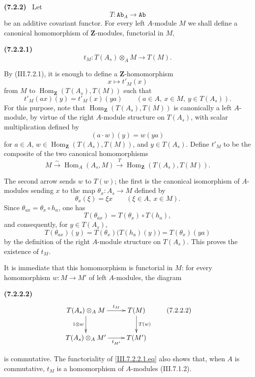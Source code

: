 \documentclass[10pt,oneside]{book}
\newcommand{\bb}[1]{\mathbf{#1}}
\newcommand{\cat}[1]{\mathtt{#1}}
\newcommand{\Hom}{\operatorname{Hom}}
\newcommand{\sref}[2][]{(#2)}
\newenvironment{env}[1][]{\par\medskip\noindent\textbf{(#1)}\ }{\par}
\begin{document}
\begin{env}[7.2.2]
\label{III.7.2.2}
Let
\[
  T:\cat{Ab}_A\longrightarrow\cat{Ab}
\]
be an additive covariant functor.  For every left $A$-module
$M$ we shall define a canonical homomorphism of $\bb Z$-modules,
functorial in $M$,
\begin{env}[7.2.2.1]
\label{III.7.2.2.1}
\[
  t_M:T(A_s)\otimes_A M\longrightarrow T(M).
  \tag{7.2.2.1}\label{III.7.2.2.1.eq}
\]
\end{env}
By \sref{III.7.2.1}, it is enough to define a
$\bb Z$-homomorphism
\[
  x\longmapsto t'_M(x)
\]
from $M$ to $\Hom_{\bb Z}(T(A_s),T(M))$ such that
\[
  t'_M(ax)(y)=t'_M(x)(ya)
  \qquad(a\in A,\ x\in M,\ y\in T(A_s)).
\]
For this purpose, note that
$\Hom_{\bb Z}(T(A_s),T(M))$ is canonically a left $A$-module,
by virtue of the right $A$-module structure on $T(A_s)$, with
scalar multiplication defined by
\[
  (a\cdot w)(y)=w(ya)
\]
for $a\in A$, $w\in\Hom_{\bb Z}(T(A_s),T(M))$, and
$y\in T(A_s)$.  Define $t'_M$ to be the composite of the two
canonical homomorphisms
\[
  M
  \xrightarrow{\sim}
  \Hom_A(A_s,M)
  \xrightarrow{T}
  \Hom_{\bb Z}(T(A_s),T(M)).
\]

The second arrow sends $w$ to $T(w)$; the first is the canonical
isomorphism of $A$-modules sending $x$ to the map
$\theta_x:A_s\to M$ defined by
\[
  \theta_x(\xi)=\xi x
  \qquad(\xi\in A,\ x\in M).
\]
Since $\theta_{ax}=\theta_x\circ h_a$, one has
\[
  T(\theta_{ax})
  =
  T(\theta_x)\circ T(h_a),
\]
and consequently, for $y\in T(A_s)$,
\[
  T(\theta_{ax})(y)
  =
  T(\theta_x)\bigl(T(h_a)(y)\bigr)
  =
  T(\theta_x)(ya)
\]
by the definition of the right $A$-module structure on
$T(A_s)$.  This proves the existence of $t_M$.

It is immediate that this homomorphism is functorial in $M$:
for every homomorphism $w:M\to M'$ of left $A$-modules, the
diagram
\begin{env}[7.2.2.2]
\label{III.7.2.2.2}
\[
\xymatrix{
  T(A_s)\otimes_A M
    \ar[r]^-{t_M}\ar[d]_{1\otimes w}
  & T(M)\ar[d]^{T(w)}
  \\
  T(A_s)\otimes_A M'
    \ar[r]_-{t_{M'}}
  & T(M')
}
\tag{7.2.2.2}\label{III.7.2.2.2.eq}
\]
\end{env}
is commutative.  The functoriality of
\eqref{III.7.2.2.1.eq} also shows that, when $A$ is
commutative, $t_M$ is a homomorphism of $A$-modules
\sref{III.7.1.2}.
\end{env}
\end{document}
